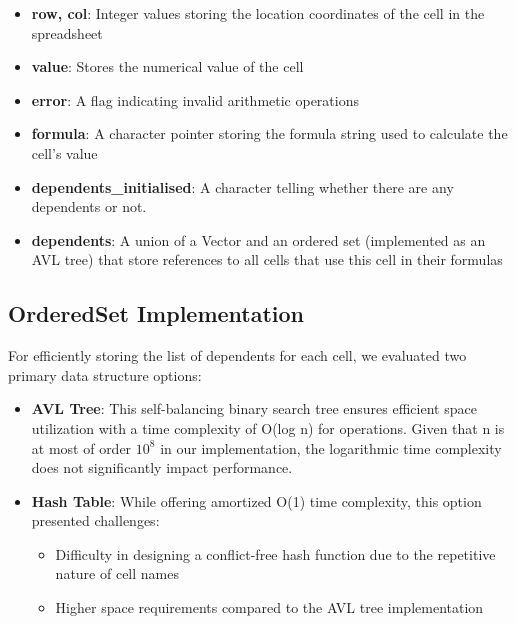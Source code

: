 \documentclass[10pt,a4paper]{article}  %
\begin{document}
\begin{itemize}
    \item \textbf{row, col}: Integer values storing the location coordinates of the cell in the spreadsheet
    \item \textbf{value}: Stores the numerical value of the cell
    \item \textbf{error}: A flag indicating invalid arithmetic operations 
    \item \textbf{formula}: A character pointer storing the formula string used to calculate the cell's value
    \item \textbf{dependents_initialised}: A character telling whether there are any dependents or not.
    \item \textbf{dependents}: A union of a Vector and an ordered set (implemented as an AVL tree) that store references to all cells that use this cell in their formulas
    
\end{itemize}





\subsection{OrderedSet Implementation}
For efficiently storing the list of dependents for each cell, we evaluated two primary data structure options:

\begin{itemize}
    \item \textbf{AVL Tree}: This self-balancing binary search tree ensures efficient space utilization with a time complexity of O(log n) for operations. Given that n is at most of order $10^8$ in our implementation, the logarithmic time complexity does not significantly impact performance.
    
    \item \textbf{Hash Table}: While offering amortized O(1) time complexity, this option presented challenges:
    \begin{itemize}
        \item Difficulty in designing a conflict-free hash function due to the repetitive nature of cell names
        \item Higher space requirements compared to the AVL tree implementation
    \end{itemize}
\end{itemize}
\end{document}
